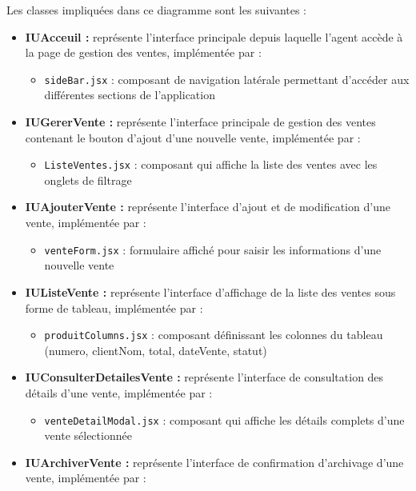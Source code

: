 Les classes impliquées dans ce diagramme sont les suivantes :
\begin{itemize}[leftmargin=2em, topsep=4pt, itemsep=4pt]
  \item \textbf{IUAcceuil :} représente l'interface principale depuis laquelle l'agent accède à la page de gestion des ventes, implémentée par :
  \begin{itemize}[leftmargin=2em, topsep=2pt, itemsep=2pt]
    \item \texttt{sideBar.jsx} : composant de navigation latérale permettant d'accéder aux différentes sections de l'application
  \end{itemize}
  \item \textbf{IUGererVente :} représente l'interface principale de gestion des ventes contenant le bouton d'ajout d'une nouvelle vente, implémentée par :
  \begin{itemize}[leftmargin=2em, topsep=2pt, itemsep=2pt]
    \item \texttt{ListeVentes.jsx} : composant qui affiche la liste des ventes avec les onglets de filtrage
  \end{itemize}
  \item \textbf{IUAjouterVente :} représente l'interface d'ajout et de modification d'une vente, implémentée par :
  \begin{itemize}[leftmargin=2em, topsep=2pt, itemsep=2pt]
    \item \texttt{venteForm.jsx} : formulaire affiché pour saisir les informations d'une nouvelle vente
  \end{itemize}
  \item \textbf{IUListeVente :} représente l'interface d'affichage de la liste des ventes sous forme de tableau, implémentée par :
  \begin{itemize}[leftmargin=2em, topsep=2pt, itemsep=2pt]
    \item \texttt{produitColumns.jsx} : composant définissant les colonnes du tableau (numero, clientNom, total, dateVente, statut)
  \end{itemize}
  \item \textbf{IUConsulterDetailesVente :} représente l'interface de consultation des détails d'une vente, implémentée par :
  \begin{itemize}[leftmargin=2em, topsep=2pt, itemsep=2pt]
    \item \texttt{venteDetailModal.jsx} : composant qui affiche les détails complets d'une vente sélectionnée
  \end{itemize}
  \item \textbf{IUArchiverVente :} représente l'interface de confirmation d'archivage d'une vente, implémentée par :

\end{itemize}
